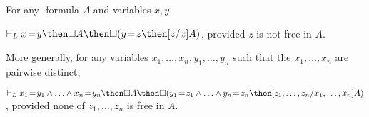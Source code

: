 \documentclass[11pt]{woarticle}
\theoremstyle{break}
\theoremstyle{nonumberplain}
\newcommand{\1}{\;\,|\;\,}
\newcommand{\T}[1]{\ensuremath{(\mathrm{ #1})}}
\newcommand{\itemT}[1]{\item[\T{#1}]}
\begin{document}
\begin{lemma}
  For any -formula $A$ and variables $x,y$,
  \begin{semantics}
    \itemT{CS} $\vdash_L x\!=\!y \then \Box A \then \Box(y\!=\!z \then
    [z/x]A)$, provided $z$ is not free in $A$.
  \end{semantics}
  More generally, for any variables $x_1,\ldots,x_n,y_1,\ldots,y_n$
  such that the $x_1,\ldots,x_n$ are pairwise distinct,
  \begin{semantics}
    \itemT{CS_n} $\vdash_L x_1\!=\!y_1 \land \ldots \land x_n\!=\!y_n
    \then \Box A \then \Box(y_1\!=\!z_1 \land \ldots \land y_n\!=\!z_n
    \then [z_1,\ldots,z_n/x_1,\ldots,x_n]A)$, provided none of
    $z_1,\ldots,z_n$ is free in $A$.
  \end{semantics}
\end{lemma}
\end{document}
